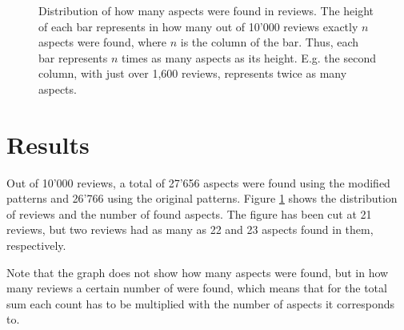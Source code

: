 \documentclass[a4paper,11pt]{kth-mag}
\begin{document}
\begin{figure}
  \centering
  \caption{Distribution of how many aspects were found in  reviews.
    The height of each bar represents in how many out of 10'000 reviews exactly $n$
    aspects were found, where $n$ is the column of the bar. Thus, each bar represents
    $n$ times as many aspects as its height. E.g. the second column, with just over 1,600
    reviews, represents twice as many aspects.
  }
  \label{fig:extr_count}
\end{figure}

\clearpage

\section{Results}

Out of 10'000 reviews, a total of 27'656 aspects were found using the modified patterns
and 26'766 using the original patterns.
Figure \ref{fig:extr_count} shows the distribution of reviews and the number of
found aspects. The figure has been cut at 21 reviews, but two reviews had as many
as 22 and 23 aspects found in them, respectively.

Note that the graph does not show how many aspects were found,
but in how many reviews a certain number of were found, which means that for the
total sum each count has to be multiplied with the number of aspects it corresponds to.
\end{document}
